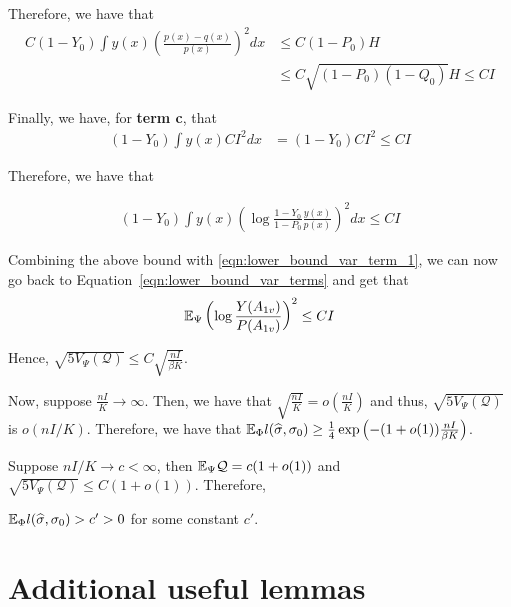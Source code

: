 \documentclass{article}
\begin{document}
Therefore, we have that
\begin{align*}
C (1 - Y_0) \int y(x) \left( \frac{ p(x) - q(x)}{p(x)} \right)^2 dx &\leq 
        C ( 1 - P_0) H \\
   &\leq C \sqrt{ (1 - P_0)(1 - Q_0)} H \leq C I
\end{align*}


Finally, we have, for \textbf{term c}, that
\begin{align*}
(1 - Y_0) \int y(x) C I^2 dx &= (1 - Y_0) C I^2 \leq C I 
\end{align*}

Therefore, we have that 

\begin{align*}
(1 - Y_0) \int y(x) \left( \log \frac{1 - Y_0}{1 - P_0} \frac{y(x)}{p(x)} \right)^2 dx \leq C I 
\end{align*}

Combining the above bound with \ref{eqn:lower_bound_var_term_1}, we can now 
go back to Equation~\ref{eqn:lower_bound_var_terms} and get that
\begin{align*}
{\mathbb E}_{\Psi} \left( \log \frac{Y(A_{1v})}{P(A_{1v})} \right)^2 \leq C I 
\end{align*}

Hence, $\sqrt{5 V_{\Psi} (\mathcal{Q})} \leq C \sqrt{ \frac{n I}{\beta K}}$. 



Now, suppose $\frac{nI}{K} \rightarrow \infty$. Then, we have that $\sqrt{\frac{nI}{K}} = o \left( \frac{nI}{K} \right)$ and thus, $\sqrt{ 5 V_{\Psi}(\mathcal{Q})}$ is $o( n I/ K)$. Therefore, we have that ${\mathbb E}_{\Phi} l(\widehat{\sigma}, \sigma_0) \geq \frac{1}{4} \exp \left( - (1 + o(1)) \frac{nI}{\beta K} \right)$. 


Suppose $nI/K \rightarrow c < \infty$, then ${\mathbb E}_{\Psi} \mathcal{Q} = c (1 + o(1))$ and $\sqrt{ 5 V_{\Psi}(\mathcal{Q})} \leq C ( 1 + o(1))$. Therefore, 

 ${\mathbb E}_{\Phi} l(\widehat{\sigma}, \sigma_0) > c' > 0$ for some constant $c'$. 







\section{Additional useful lemmas}
\end{document}
